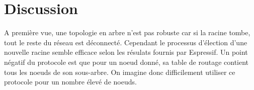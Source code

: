             \section{Discussion}
            A première vue, une topologie en arbre n'est pas robuste car si la racine tombe,
            tout le reste du réseau est déconnecté. Cependant le processus d'élection
            d'une nouvelle racine semble efficace selon les résulats fournis par Espressif.
            Un point négatif du protocole est que pour un noeud donné, sa table de routage contient tous les
            noeuds de son sous-arbre.
            On imagine donc difficilement utiliser ce protocole pour un nombre élevé de noeuds.